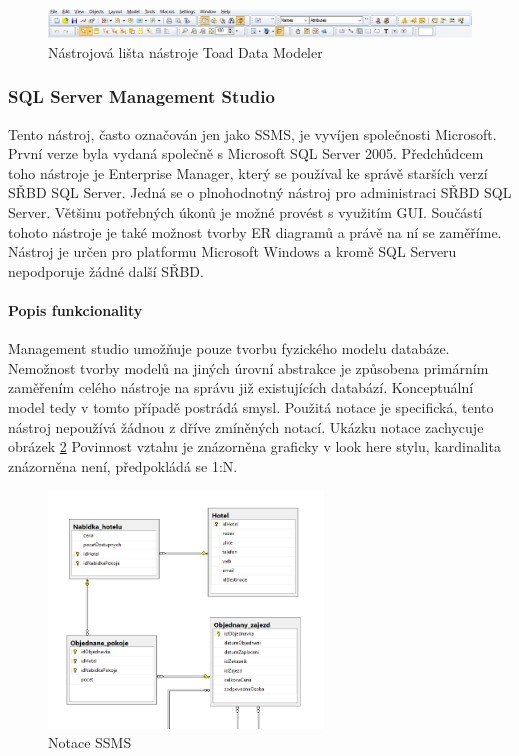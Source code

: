 \documentclass[czech,bachelor,public,dept460,male,oneside]{diploma}
\begin{document}
		\begin{figure}[!h]
			\centering
			\includegraphics[width=1\textwidth]{Figures/EditorToad}
			\caption[Nástrojová lišta nástroje Toad Data Modeler]{Nástrojová lišta nástroje Toad Data Modeler}
			\label{fig:toadMenu}
		\end{figure}
		
		\subsubsection{SQL Server Management Studio}
		Tento nástroj, často označován jen jako SSMS, je vyvíjen společnosti Microsoft. První verze byla vydaná společně s Microsoft SQL Server 2005. Předchůdcem toho nástroje je Enterprise Manager, který se používal ke správě starších verzí SŘBD SQL Server. Jedná se o plnohodnotný nástroj pro administraci SŘBD SQL Server. Většinu potřebných úkonů je možné provést s využitím GUI. Součástí tohoto nástroje je také možnost tvorby ER diagramů a právě na ní se zaměříme. Nástroj je určen pro platformu Microsoft Windows a kromě SQL Serveru nepodporuje žádné další SŘBD.
		
		\paragraph{Popis funkcionality}
		Management studio umožňuje pouze tvorbu fyzického modelu databáze. Nemožnost tvorby modelů na jiných úrovní abstrakce je způsobena primárním zaměřením celého nástroje na správu již existujících databází. Konceptuální model tedy v tomto případě postrádá smysl. Použitá notace je specifická, tento nástroj nepoužívá žádnou z dříve zmíněných notací. Ukázku notace zachycuje obrázek \ref{fig:notSSMS} Povinnost vztahu je znázorněna graficky v look here stylu, kardinalita znázorněna není, předpokládá se 1:N. 
		
		\begin{figure}[!h]
			\centering
			\includegraphics[width=0.65\textwidth]{Figures/EditorSSMS}
			\caption[Notace SSMS]{Notace SSMS}
			\label{fig:notSSMS}
		\end{figure}
		
\end{document}
